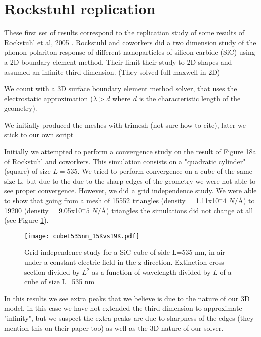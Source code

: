 
\section{Rockstuhl replication}

These first set of results correspond to the replication study of some results 
of Rockstuhl et al, 2005 \cite{rockstuhl2005}. Rockstuhl and coworkers did a two dimension 
study of the phonon-polariton response of different nanoparticles of silicon carbide (SiC)
using a 2D boundary element method. Their limit their study to 2D shapes and assumed an infinite
third dimension. (They solved full maxwell in 2D)


We count with a 3D surface boundary element method solver, that uses the electrostatic approximation
($\lambda > d$ where $d$ is the characteristic length of the geometry). 

{\color{red}We initially produced the meshes with trimesh (not sure how to cite), later we stick to 
our own script}

Initially we attempted to perform a convergence study on the result of Figure 18a
of Rockstuhl and coworkers. This simulation consists on a "quadratic cylinder" (square)
of size $L=535$. We tried to perform convergence on a cube of the same size L, but
due to the due to the sharp edges of the geometry we were not able to see proper convergence. 
However, we did a grid independence study. We were able to show that going from a mesh of 15552 
triangles (density = 1.11x10$^-4$ $N/\text{\AA}$) to 19200 (density = 9.05x10$^-5$ $N/\text{\AA}$) 
triangles the simulations did not change at all (see Figure \ref{fig:cube535}).  

\begin{figure}
    \centering
    \texttt{[image: cubeL535nm\_15Kvs19K.pdf]} 
    \caption{Grid independence study for a SiC cube of side L=535 nm, in air under a constant 
    electric field in the z-direction. Extinction cross section divided by $L^2$ as a function of wavelength divided 
    by $L$ of a cube of size L=535 nm}
    \label{fig:cube535}
 \end{figure}

In this results we see extra peaks that we believe is due to the nature of our 3D model, in this case 
we have not extended the third dimension to approximate "infinity", but we suspect the extra peaks are 
due to sharpness of the edges (they mention this on their paper too) as well as the 3D nature of our solver.


